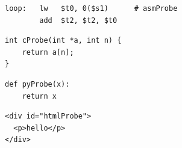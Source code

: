 

\begin{codebox}
\begin{asmblock}
\begin{lstlisting}[style=asm]
loop:   lw   $t0, 0($s1)      # asmProbe
        add  $t2, $t2, $t0
\end{lstlisting}
\end{asmblock}
\end{codebox}
\clearpage
\begin{codebox}
\begin{asmblock}
\begin{lstlisting}[style=cstyle]
int cProbe(int *a, int n) {
    return a[n];
}
\end{lstlisting}
\end{asmblock}
\end{codebox}
\clearpage
\begin{codebox}
\begin{asmblock}
\begin{lstlisting}[style=pystyle]
def pyProbe(x):
    return x
\end{lstlisting}
\end{asmblock}
\end{codebox}
\clearpage
\begin{codebox}
\begin{asmblock}
\begin{lstlisting}[style=htmlstyle]
<div id="htmlProbe">
  <p>hello</p>
</div>
\end{lstlisting}
\end{asmblock}
\end{codebox}

